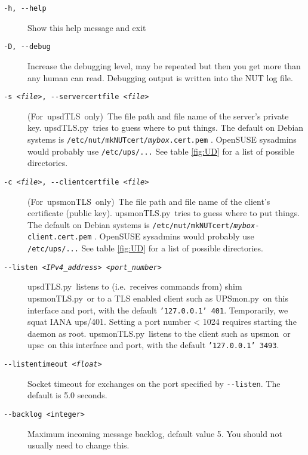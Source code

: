 \documentclass[12pt]{article}
\newcommand{\upsmon}{\mbox{\textcolor{MONCOLOUR}{upsmon}}}
\newcommand{\upsc}{\mbox{\textcolor{UPSMONCOLOUR}{upsc}}}
\newcommand{\upsdTLS}{\mbox{\textcolor{UPSDCOLOUR}{upsdTLS.py}}}
\newcommand{\upsmonTLS}{\mbox{\textcolor{UPSMONCOLOUR}{upsmonTLS.py}}}
\newcommand{\UPSmon}{\mbox{\textcolor{UPSMONCOLOUR}{UPSmon.py}}}
\newcommand{\upsdTLSonly}{\mbox{\textcolor{UPSDCOLOUR}{(For upsdTLS only)}}}
\newcommand{\upsmonTLSonly}{\mbox{\textcolor{UPSMONCOLOUR}{(For upsmonTLS only)}}}
\begin{document}
\begin{description}

\item[\texttt{-h, -\/-help}]  Show this help message and exit

\item[\texttt{-D, -\/-debug}] Increase the debugging level, may be repeated
  but then you get more than any human can read.  Debugging output is written
  into the NUT log file.

\item[\texttt{-s \textit{<file>}, -\/-servercertfile \textit{<file>}}] \upsdTLSonly\ The
  file path and file name of the server's private key.  \upsdTLS\ tries to
  guess where to put things.  The default on Debian systems is
  \texttt{/etc/{\allowbreak}nut/{\allowbreak}mkNUTcert/{\allowbreak}\textit{mybox}.cert.pem}
  .  OpenSUSE sysadmins would probably use \texttt{/etc/{\allowbreak}ups/...}
  See table \ref{fig:UD} for a list of possible directories.

\item[\texttt{-c \textit{<file>}, -\/-clientcertfile \textit{<file>}}]
  \upsmonTLSonly\ The file path and file name of the client's certificate
  (public key).  \upsmonTLS\ tries to guess where to put things.  The default
  on Debian systems is
  \texttt{/etc/{\allowbreak}nut/{\allowbreak}mkNUTcert/{\allowbreak}\textit{mybox}-client.cert.pem}
  .  OpenSUSE sysadmins would probably use \texttt{/etc/{\allowbreak}ups/...}
  See table \ref{fig:UD} for a list of possible directories.

\item[\texttt{-\/-listen \textit{<IPv4\_address>} \textit{<port\_number>}}]
  \upsdTLS\ listens to (i.e.\ receives commands from) shim \upsmonTLS\ or to a
  TLS enabled client such as \UPSmon\ on this interface and port, with the
  default \texttt{'127.0.0.1' 401}. Temporarily, we squat IANA
  ups/401. Setting a port number < 1024 requires starting the daemon as root.
  \upsmonTLS\ listens to the client such as \upsmon\ or \upsc\ on this
  interface and port, with the default \texttt{'127.0.0.1' 3493}.

\item[\texttt{-\/-listentimeout \textit{<float>}}] Socket timeout for
  exchanges on the port specified by \texttt{-\/-listen}.  The default is 5.0
  seconds.

\item[\texttt{-\/-backlog <integer>}] Maximum incoming message backlog, default
  value 5.  You should not usually need to change this.


\end{description}
\end{document}
